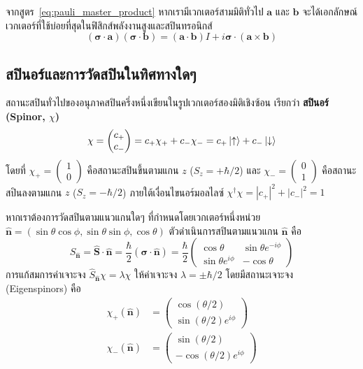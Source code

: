 จากสูตร~\eqref{eq:pauli_master_product} หากเรามีเวกเตอร์สามมิติทั่วไป $\mathbf{a}$ และ $\mathbf{b}$ จะได้เอกลักษณ์เวกเตอร์ที่ใช้บ่อยที่สุดในฟิสิกส์พลังงานสูงและสปินทรอนิกส์
\begin{equation}
(\boldsymbol{\sigma}\cdot\mathbf{a})(\boldsymbol{\sigma}\cdot\mathbf{b}) = (\mathbf{a}\cdot\mathbf{b}) I + i \boldsymbol{\sigma}\cdot(\mathbf{a}\times\mathbf{b})
\label{eq:pauli_vector_identity}
\end{equation}

\subsection{สปินอร์และการวัดสปินในทิศทางใดๆ}
สถานะสปินทั่วไปของอนุภาคสปินครึ่งหนึ่งเขียนในรูปเวกเตอร์สองมิติเชิงซ้อน เรียกว่า \textbf{สปินอร์ (Spinor, $\chi$)}
\begin{equation}
\chi = \begin{pmatrix} c_+ \\ c_- \end{pmatrix} = c_+ \chi_+ + c_- \chi_- = c_+ \ket{\uparrow} + c_- \ket{\downarrow}
\label{eq:spinor_representation}
\end{equation}
โดยที่ $\chi_+ = \begin{pmatrix} 1 \\ 0 \end{pmatrix}$ คือสถานะสปินขึ้นตามแกน $z$ ($S_z = +\hbar/2$) และ $\chi_- = \begin{pmatrix} 0 \\ 1 \end{pmatrix}$ คือสถานะสปินลงตามแกน $z$ ($S_z = -\hbar/2$) ภายใต้เงื่อนไขนอร์มอลไลซ์ $\chi^\dagger \chi = |c_+|^2 + |c_-|^2 = 1$

หากเราต้องการวัดสปินตามแนวแกนใดๆ ที่กำหนดโดยเวกเตอร์หนึ่งหน่วย $\hat{\mathbf{n}} = (\sin\theta\cos\phi, \sin\theta\sin\phi, \cos\theta)$ ตัวดำเนินการสปินตามแนวแกน $\hat{\mathbf{n}}$ คือ
\begin{equation}
\hat{S}_{\hat{\mathbf{n}}} = \hat{\mathbf{S}}\cdot\hat{\mathbf{n}} = \frac{\hbar}{2} (\boldsymbol{\sigma}\cdot\hat{\mathbf{n}}) = \frac{\hbar}{2} \begin{pmatrix} \cos\theta & \sin\theta e^{-i\phi} \\ \sin\theta e^{i\phi} & -\cos\theta \end{pmatrix}
\label{eq:spin_along_n}
\end{equation}
การแก้สมการค่าเจาะจง $\hat{S}_{\hat{\mathbf{n}}} \chi = \lambda \chi$ ให้ค่าเจาะจง $\lambda = \pm \hbar/2$ โดยมีสถานะเจาะจง (Eigenspinors) คือ
\begin{align}
\chi_+(\hat{\mathbf{n}}) &= \begin{pmatrix} \cos(\theta/2) \\ \sin(\theta/2) e^{i\phi} \end{pmatrix} \label{eq:eigenspinor_plus} \\
\chi_-(\hat{\mathbf{n}}) &= \begin{pmatrix} \sin(\theta/2) \\ -\cos(\theta/2) e^{i\phi} \end{pmatrix} \label{eq:eigenspinor_minus}
\end{align}

